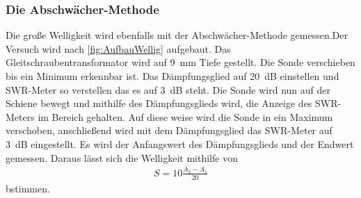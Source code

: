 \subsubsection{Die Abschwächer-Methode}
Die große Welligkeit wird ebenfalls mit der Abschwächer-Methode gemessen.Der Versuch wird nach \cref{fig:AufbauWellig} aufgebaut. Das Gleitschraubentransformator wird auf \SI{9}{\milli\meter} Tiefe gestellt.
Die Sonde verschieben bis ein Minimum erkennbar ist. Das Dämpfungsglied auf \SI{20}{\deci\bel} einstellen und SWR-Meter so verstellen das es auf \SI{3}{\deci\bel} steht. Die Sonde wird nun auf der Schiene bewegt und mithilfe des Dämpfungsglieds wird, die Anzeige des SWR-Meters im Bereich gehalten. Auf diese weise wird die Sonde in ein Maximum verschoben, anschließend wird mit dem Dämpfungsglied das SWR-Meter auf \SI{3}{\deci\bel} eingestellt. Es wird der Anfangswert des Dämpfungsglieds und der Endwert gemessen. Daraus lässt sich die Welligkeit mithilfe von 
\begin{align}
	S=10\frac{A_2-A_1}{20}
	\label{eq:SWR_Abschwaecher}
\end{align}
bstimmen.